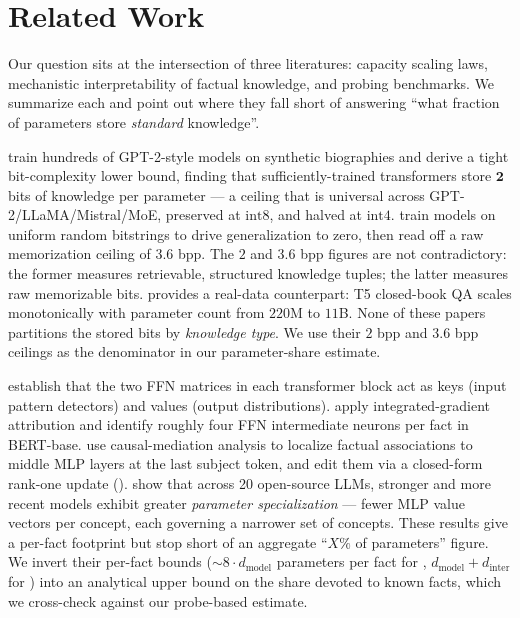 \section{Related Work}
\label{sec:related}

Our question sits at the intersection of three literatures: capacity scaling laws, mechanistic interpretability of factual knowledge, and probing benchmarks. We summarize each and point out where they fall short of answering ``what fraction of parameters store \emph{standard} knowledge''.

 \citet{allenzhu2024knowledge} train hundreds of GPT-2-style models on synthetic biographies and derive a tight bit-complexity lower bound, finding that sufficiently-trained transformers store \(\mathbf{2}\) bits of knowledge per parameter --- a ceiling that is universal across GPT-2/LLaMA/Mistral/MoE, preserved at \(\text{int}8\), and halved at \(\text{int}4\). \citet{morris2025memorize} train models on uniform random bitstrings to drive generalization to zero, then read off a raw memorization ceiling of \(\mathbf{3.6}\) bpp. The \(2\) and \(3.6\) bpp figures are not contradictory: the former measures retrievable, structured knowledge tuples; the latter measures raw memorizable bits. \citet{roberts2020packknowledge} provides a real-data counterpart: T5 closed-book QA scales monotonically with parameter count from \(220\)M to \(11\)B. None of these papers partitions the stored bits by \emph{knowledge type}. We use their \(2\) bpp and \(3.6\) bpp ceilings as the denominator in our parameter-share estimate.

 \citet{geva2021ffnkv} establish that the two FFN matrices in each transformer block act as keys (input pattern detectors) and values (output distributions). \citet{dai2022knowledge} apply integrated-gradient attribution and identify roughly four FFN intermediate neurons per fact in BERT-base. \citet{meng2022rome} use causal-mediation analysis to localize factual associations to middle MLP layers at the last subject token, and edit them via a closed-form rank-one update (\rome). \citet{hong2025specialization} show that across 20 open-source LLMs, stronger and more recent models exhibit greater \emph{parameter specialization} --- fewer MLP value vectors per concept, each governing a narrower set of concepts. These results give a per-fact footprint but stop short of an aggregate ``\(X\%\) of parameters'' figure. We invert their per-fact bounds (\(\sim 8\cdot d_{\text{model}}\) parameters per fact for \kn, \(d_{\text{model}}+d_{\text{inter}}\) for \rome) into an analytical upper bound on the share devoted to known facts, which we cross-check against our probe-based estimate.

